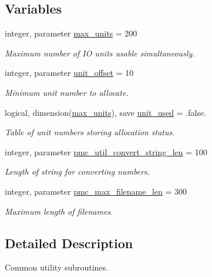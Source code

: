 \subsection*{Variables}
\begin{DoxyCompactItemize}
\item 
integer, parameter \mbox{\hyperlink{namespacepmc__util_a0bc01a46ad6e7b0d503c9181b1101ce0}{max\+\_\+units}} = 200
\begin{DoxyCompactList}\small\item\em Maximum number of IO units usable simultaneously. \end{DoxyCompactList}\item 
integer, parameter \mbox{\hyperlink{namespacepmc__util_abd64d09b01c7009bc014bd03950e3318}{unit\+\_\+offset}} = 10
\begin{DoxyCompactList}\small\item\em Minimum unit number to allocate. \end{DoxyCompactList}\item 
logical, dimension(\mbox{\hyperlink{namespacepmc__util_a0bc01a46ad6e7b0d503c9181b1101ce0}{max\+\_\+units}}), save \mbox{\hyperlink{namespacepmc__util_a172ec1eea3cead7645401a0b8c55fcb0}{unit\+\_\+used}} = .false.
\begin{DoxyCompactList}\small\item\em Table of unit numbers storing allocation status. \end{DoxyCompactList}\item 
integer, parameter \mbox{\hyperlink{namespacepmc__util_afd468d26aef28509c08087ba8e59089a}{pmc\+\_\+util\+\_\+convert\+\_\+string\+\_\+len}} = 100
\begin{DoxyCompactList}\small\item\em Length of string for converting numbers. \end{DoxyCompactList}\item 
integer, parameter \mbox{\hyperlink{namespacepmc__util_aca52c78318a6a444ebb5477b532ffeec}{pmc\+\_\+max\+\_\+filename\+\_\+len}} = 300
\begin{DoxyCompactList}\small\item\em Maximum length of filenames. \end{DoxyCompactList}\end{DoxyCompactItemize}


\subsection{Detailed Description}
Common utility subroutines. 

